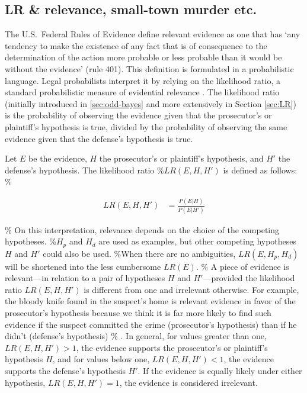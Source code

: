 \documentclass[10pt,dvipsnames,enabledeprecatedfontcommands]{scrartcl}
\begin{document}
\subsection{LR \& relevance, small-town murder
etc.}\label{lr-relevance-small-town-murder-etc.}

The U.S.~Federal Rules of Evidence define relevant evidence as one that
has `any tendency to make the existence of any fact that is of
consequence to the determination of the action more probable or less
probable than it would be without the evidence' (rule 401). This
definition is formulated in a probabilistic language. Legal probabilists
interpret it by relying on the likelihood ratio, a standard
probabilistic measure of evidential relevance
\citep{lempert1977modeling,lyon1996relevance,aitken2004statistics, aitken2010fundamentals,sullivan2016LikelihoodStoryTheory}.
The likelihood ratio (initially introduced in \ref{sec:odd-bayes} and
more extensively in Section \ref{sec:LR}) is the probability of
observing the evidence given that the prosecutor's or plaintiff's
hypothesis is true, divided by the probability of observing the same
evidence given that the defense's hypothesis is true.

Let \(E\) be the evidence, \(H\) the prosecutor's or plaintiff's
hypothesis, and \(H'\) the defense's hypothesis. The likelihood ratio
\%\(LR(E, H, H')\) is defined as follows: \%

\begin{align*}LR(E,H,H') & = \frac{P(E\vert H)}{P(E\vert H')}\end{align*}

\% On this interpretation, relevance depends on the choice of the
competing hypotheses. \%\(H_p\) and \(H_d\) are used as examples, but
other competing hypotheses \(H\) and \(H'\) could also be used. \%When
there are no ambiguities, \(LR(E, H_p, H_d)\) will be shortened into the
less cumbersome \(LR(E)\). \% A piece of evidence is relevant---in
relation to a pair of hypotheses \(H\) and \(H'\)---provided the
likelihood ratio \(LR(E, H, H')\) is different from one and irrelevant
otherwise. For example, the bloody knife found in the suspect's home is
relevant evidence in favor of the prosecutor's hypothesis because we
think it is far more likely to find such evidence if the suspect
committed the crime (prosecutor's hypothesis) than if he didn't
(defense's hypothesis) \%\citep[7]{finkelstein2009basic}
\citep{finkelstein2009basic}. In general, for values greater than one,
\(LR(E, H, H')>1\), the evidence supports the prosecutor's or
plaintiff's hypothesis \(H\), and for values below one,
\(LR(E, H, H')<1\), the evidence supports the defense's hypothesis
\(H'\). If the evidence is equally likely under either hypothesis,
\(LR(E, H, H')=1\), the evidence is considered irrelevant.
\end{document}
